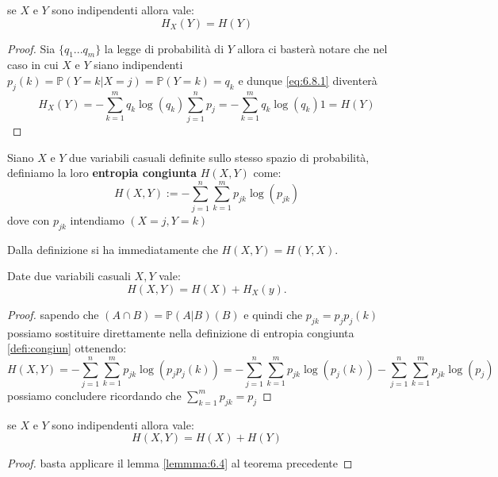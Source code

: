 \begin{lem} \label{lemmma:6.4}
se $X$ e $Y$ sono indipendenti allora vale:
\begin{equation} \label{lemma:6.4}
H_X(Y)=H(Y)
\end{equation}
\end{lem}
\begin{proof}
Sia $\{q_1...q_m\}$  la legge di probabilità di $Y$ allora ci basterà notare che nel caso in cui $X$ e $Y$ siano indipendenti $p_j(k)=\mathbb{P}(Y=k|X=j)=\mathbb{P}(Y=k)=q_k$
e dunque \ref{eq:6.8.1} diventerà
$$H_X(Y)=-\sum_{k=1}^m q_k \log(q_k)\sum_{j=1}^n p_{j}=-\sum_{k=1}^m q_k \log(q_k)1=H(Y)$$
\end{proof}

\begin{defi} \label{defi:congiun}
Siano $X$ e $Y$ due variabili casuali definite sullo stesso spazio di probabilità, definiamo la loro \textbf{entropia congiunta} $H(X,Y)$ come:
\begin{equation}\label{eq:congiun}
H(X,Y):=-\sum_{j=1}^n\sum_{k=1}^m p_{jk} \log(p_{jk})
\end{equation}
dove con $p_{jk}$ intendiamo \p$(X=j,Y=k)$
\end{defi}
\begin{oss}
Dalla definizione si ha immediatamente che $H(X,Y)=H(Y,X)$.
\end{oss}
\begin{teo} \label{teo:6.5}
Date due variabili casuali $X,Y$ vale:
\begin{equation}
H(X,Y)=H(X)+H_X(y).
\end{equation}
\end{teo}
\begin{proof}
sapendo che \p$(A \cap B)=\mathbb{P}(A|B)$\p$(B)$ e quindi che $p_{jk}=p_jp_j(k)$ possiamo sostituire direttamente nella definizione di entropia congiunta \ref{defi:congiun} ottenendo:
$$H(X,Y)=-\sum_{j=1}^n\sum_{k=1}^m p_{jk} \log(p_{j}p_{j}(k))=-\sum_{j=1}^n\sum_{k=1}^m p_{jk} \log(p_{j}(k))-\sum_{j=1}^n\sum_{k=1}^m p_{jk} \log(p_{j})$$
possiamo concludere ricordando che $\sum_{k=1}^m p_{jk}=p_j$
\end{proof}
\begin{corol}
se $X$ e $Y$ sono indipendenti allora vale:
\begin{equation}
H(X,Y)=H(X)+H(Y)
\end{equation}
\end{corol}
\begin{proof}
basta applicare il lemma \ref{lemmma:6.4} al teorema precedente
\end{proof}
